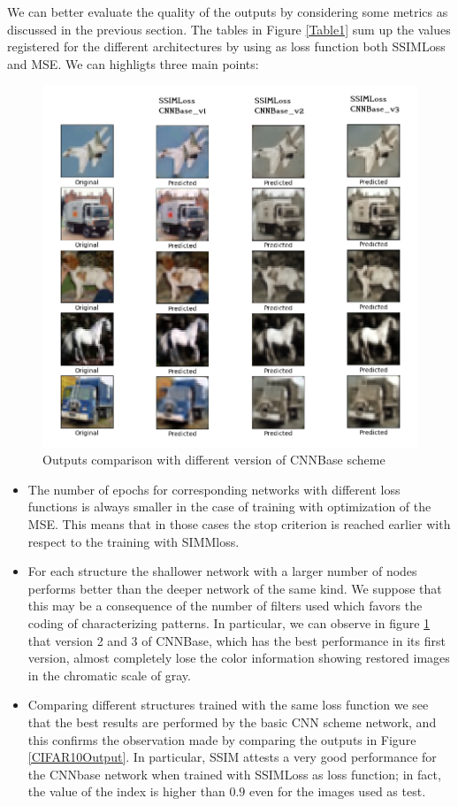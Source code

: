 \documentclass[12pt,a4paper]{report}
\begin{document}
We can better evaluate the quality of the outputs by considering some metrics as discussed in the previous section. The tables in Figure \ref{Table1} sum up the values registered for the different architectures by using as loss function both SSIMLoss and MSE. We can highligts three main points:

\begin{figure}[hptb]
\centering
\includegraphics[scale=0.45]{CNNBase_comparison.png}
\caption{Outputs comparison with different version of CNNBase scheme}
\label{CNNBase_comparison}
\end{figure}

\begin{itemize}
\item The number of epochs for corresponding networks with different loss functions is always smaller in the case of training with optimization of the MSE. This means that in those cases the stop criterion is reached earlier with respect to the training with SIMMloss.
\item For each structure the shallower network with a larger number of nodes performs better than the deeper network of the same kind. We suppose that this may be a consequence of the number of filters used which favors the coding of characterizing patterns. In particular, we can observe in figure \ref{CNNBase_comparison} that version 2 and 3 of CNNBase, which has the best performance in its first version, almost completely lose the color information showing restored images in the chromatic scale of gray.
\item Comparing different structures trained with the same loss function we see that the best results are performed by the basic CNN scheme network, and this confirms the observation made by comparing the outputs in Figure \ref{CIFAR10Output}. In particular, SSIM attests a very good performance for the CNNbase network when trained with SSIMLoss as loss function; in fact, the value of the index is higher than $0.9$ even for the images used as test.
\end{itemize}
\end{document}
